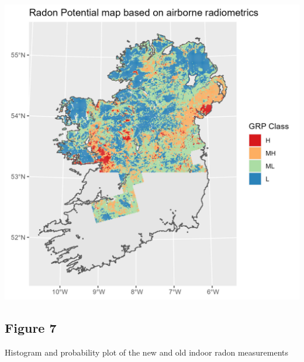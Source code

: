 \documentclass[
  12pt,
]{article}
\begin{document}
\begin{center}\includegraphics[width=0.5\linewidth]{Rresults/Figure_6} \end{center}

\hypertarget{figure-7}{%
\subsection{Figure 7}\label{figure-7}}

Histogram and probability plot of the new and old indoor radon
measurements
\end{document}

